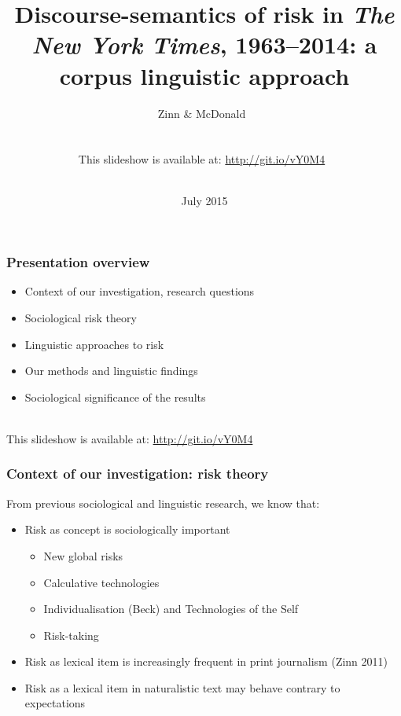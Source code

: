 \documentclass{beamer}       %
\title[ISFC Aachen 2015]{Discourse-semantics of risk in \emph{The New York Times}, 1963--2014: a corpus linguistic approach}
\author[Jens Zinn \and Daniel McDonald]{Zinn \& McDonald~\\~\\~\\This slideshow is available at: \url{http://git.io/vY0M4}~\\~\\}
\date{July 2015}
\begin{document}

\frame{\titlepage}


\begin{frame}
    \frametitle{Presentation overview}
    
    \begin{itemize}
    \item Context of our investigation, research questions
    \item Sociological risk theory
    \item Linguistic approaches to risk
    \item Our methods and linguistic findings
    \item Sociological significance of the results
    \end{itemize}

    ~\\ This slideshow is available at: \url{http://git.io/vY0M4}

\end{frame}


\begin{frame}
    \frametitle{Context of our investigation: risk theory}
    
    From previous sociological and linguistic research, we know that:

    \begin{itemize}
    \item Risk as concept is sociologically important
    \begin{itemize}
        \item New global risks \cite{beck_risk_1992}
        \item Calculative technologies \cite{dean_risk_1998,dean_governmentality:_2010}
        \item Individualisation (Beck) and Technologies of the Self \cite{foucault_technologies_1988}
        \item Risk-taking \cite{luhmann_risk:_1993}
    \end{itemize}
    \item Risk as lexical item is increasingly frequent in print journalism (Zinn 2011)
    \item Risk as a lexical item in naturalistic text may behave contrary to expectations \cite{hamilton_meanings_2007}
    \end{itemize}
\end{frame}
\end{document}

